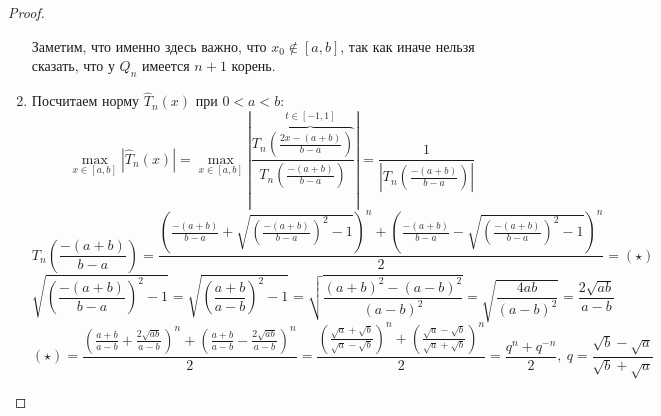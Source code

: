 \begin{proof}
\begin{enumerate}
          Заметим, что именно здесь важно, что $x_0\notin[a,b]$, так как иначе
          нельзя сказать, что у $Q_n$ имеется $n+1$ корень.
    \item Посчитаем норму $\hat{T}_n(x)$ при $0<a<b$:
          \[\max_{x\in[a,b]}|\hat{T}_n(x)|=\max_{x\in[a,b]}\left|\frac{T_n\overbrace{\left(\frac{2x-(a+b)}{b-a}\right)}^{t\in[-1,1]}}{T_n\left(\frac{-(a+b)}{b-a}\right)}\right|=\frac{1}{\left|T_n\left(\frac{-(a+b)}{b-a}\right)\right|}\]
          \[T_n\left(\frac{-(a+b)}{b-a}\right)=\frac{\left(\frac{-(a+b)}{b-a}+\sqrt{\left(\frac{-(a+b)}{b-a}\right)^2-1}\right)^n+\left(\frac{-(a+b)}{b-a}-\sqrt{\left(\frac{-(a+b)}{b-a}\right)^2-1}\right)^n}{2}=(\star)\]
          \[\sqrt{\left(\frac{-(a+b)}{b-a}\right)^2-1}=\sqrt{\left(\frac{a+b}{a-b}\right)^2-1}=\sqrt{\frac{(a+b)^2-(a-b)^2}{(a-b)^2}}=\sqrt{\frac{4ab}{(a-b)^2}}=\frac{2\sqrt{ab}}{a-b}\]
          \[(\star)=\frac{\left(\frac{a+b}{a-b}+\frac{2\sqrt{ab}}{a-b}\right)^n+\left(\frac{a+b}{a-b}-\frac{2\sqrt{ab}}{a-b}\right)^n}{2}=\frac{\left(\frac{\sqrt{a}+\sqrt{b}}{\sqrt{a}-\sqrt{b}}\right)^n+\left(\frac{\sqrt{a}-\sqrt{b}}{\sqrt{a}+\sqrt{b}}\right)^n}{2}=\frac{q^n+q^{-n}}{2},\ q=\frac{\sqrt{b}-\sqrt{a}}{\sqrt{b}+\sqrt{a}}\]
  \end{enumerate}
\end{proof}

